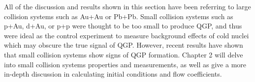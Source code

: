 All of the discussion and results shown in this section have been referring to large collision systems such as Au+Au or Pb+Pb. Small collision systems such as p+Au, d+Au, or p+p were thought to be too small to produce QGP, and thus were ideal as the control experiment to measure background effects of cold nuclei which may obscure the true signal of QGP. However, recent results have shown that small collision systems show signs of QGP formation. Chapter 2 will delve into small collision systems properties and measurements, as well as give a more in-depth discussion in calculating initial conditions and flow coefficients.
